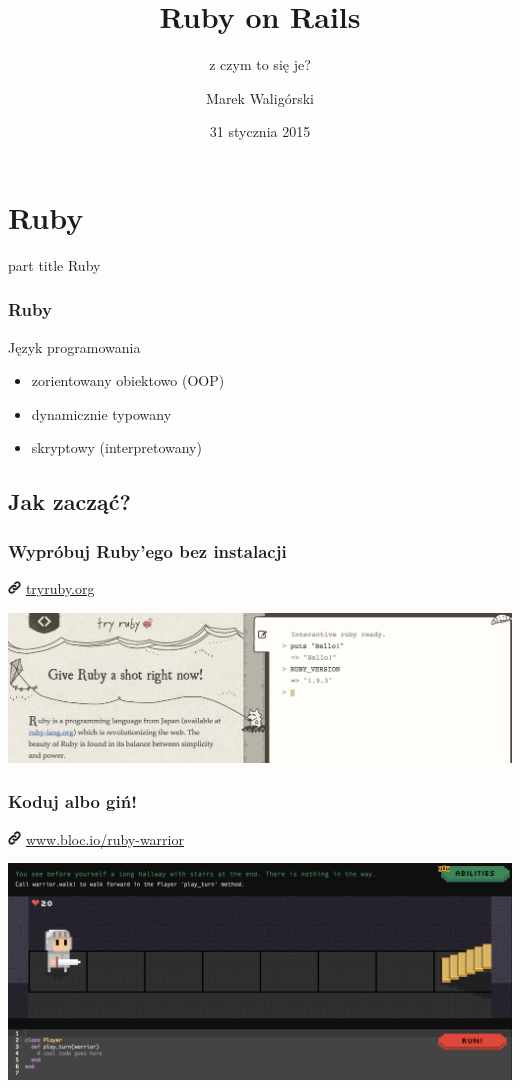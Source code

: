 \documentclass{beamer}
\title{Ruby on Rails}
\subtitle{z czym to się je?}
\author{Marek Waligórski}
\date{31 stycznia 2015}
\institute{InfoMEET Poznań}
\newcommand{\myurl}[1]{%
    \begin{block}{}
       \centering \huge
       \includegraphics[width=0.35cm]{link.png}
       \hspace{0.1cm}
       \url{#1}
    \end{block}
}
\newcommand{\mysection}[1]{%
    \section{#1}
    \begin{frame}[plain]
        \begin{centering}
        \vspace{1em}\par
            \begin{beamercolorbox}[rounded=true,sep=4pt,center]{part title}
               \huge #1
            \end{beamercolorbox}
        \end{centering}
    \end{frame}
}
\begin{document}
\begin{frame}[fragile]
\titlepage
\end{frame}

\mysection{Ruby}

\begin{frame}[fragile]\frametitle{Ruby}
    \begin{block}{Język programowania}
    \begin{itemize}
        \item zorientowany obiektowo (OOP)
        \item dynamicznie typowany
        \item skryptowy (interpretowany)
    \end{itemize}
    \end{block}
\end{frame}

\subsection{Jak zacząć?}
\begin{frame}[fragile]
\frametitle{Wypróbuj Ruby'ego bez instalacji}
    \myurl{tryruby.org}
    \hspace*{-1.1cm}
    \includegraphics[width=\paperwidth]{tryruby.png}
\end{frame}
\begin{frame}[fragile]
\frametitle{Koduj albo giń!}
    \myurl{www.bloc.io/ruby-warrior}
    \hspace*{-1.1cm}
    \includegraphics[width=\paperwidth]{rubywarrior.png}
\end{frame}
\end{document}
